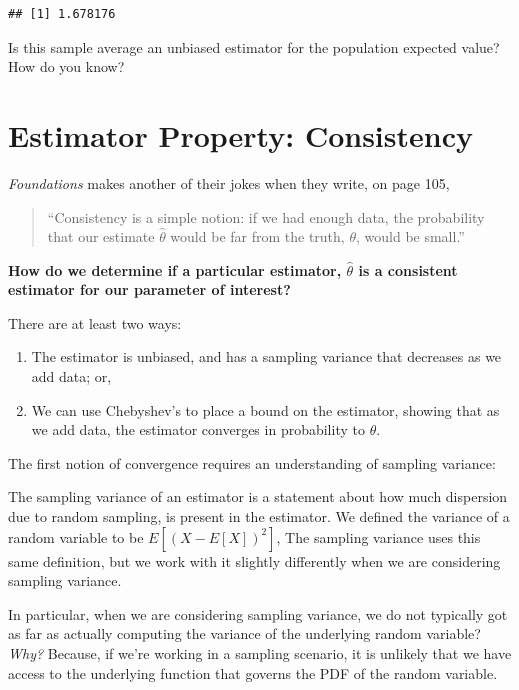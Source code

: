 \documentclass[
]{book}
\providecommand{\tightlist}{%
  \setlength{\itemsep}{0pt}\setlength{\parskip}{0pt}}
\theoremstyle{definition}
\theoremstyle{definition}
\theoremstyle{definition}
\theoremstyle{definition}
\theoremstyle{remark}
\begin{document}
\begin{verbatim}
## [1] 1.678176
\end{verbatim}

Is this sample average an unbiased estimator for the population expected value? How do you know?

\section{Estimator Property: Consistency}\label{estimator-property-consistency}

\emph{Foundations} makes another of their jokes when they write, on page 105,

\begin{quote}
``Consistency is a simple notion: if we had enough data, the probability that our estimate \(\hat{\theta}\) would be far from the truth, \(\theta\), would be small.''
\end{quote}

\textbf{How do we determine if a particular estimator, \(\hat{\theta}\) is a consistent estimator for our parameter of interest?}

There are at least two ways:

\begin{enumerate}
\def\labelenumi{\arabic{enumi}.}
\tightlist
\item
  The estimator is unbiased, and has a sampling variance that decreases as we add data; or,
\item
  We can use Chebyshev's to place a bound on the estimator, showing that as we add data, the estimator converges in probability to \(\theta\).
\end{enumerate}

The first notion of convergence requires an understanding of sampling variance:

The sampling variance of an estimator is a statement about how much dispersion due to random sampling, is present in the estimator. We defined the variance of a random variable to be \(E\left[(X - E[X])^{2}\right]\), The sampling variance uses this same definition, but we work with it slightly differently when we are considering sampling variance.

In particular, when we are considering sampling variance, we do not typically got as far as actually computing the variance of the underlying random variable? \emph{Why?} Because, if we're working in a sampling scenario, it is unlikely that we have access to the underlying function that governs the PDF of the random variable.
\end{document}
